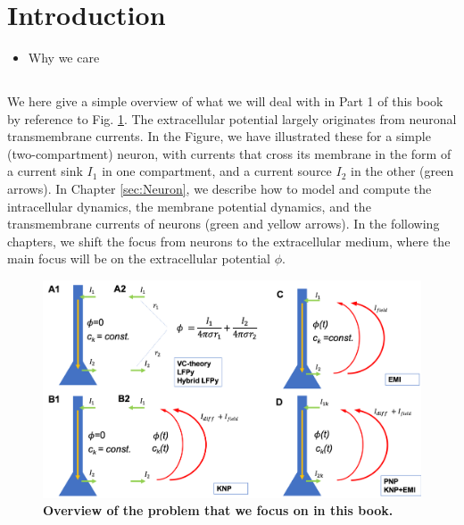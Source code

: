 \section{Introduction} 
\label{sec:Intro}

\begin{itemize}
\item Why we care \citep{Buzsaki2012,Pettersen2012,Einevoll2013,Einevoll2013a,Einevoll2019}
\end{itemize}


\subsection{}


We here give a simple overview of what we will deal with in Part 1 of this book by reference to Fig. \ref{Intro:fig:Knallfigur}. The extracellular potential largely originates from neuronal transmembrane currents. In the Figure, we have illustrated these for a simple (two-compartment) neuron, with currents that cross its membrane in the form of a current sink $I_1$ in one compartment, and a current source $I_2$ in the other (green arrows). In Chapter \ref{sec:Neuron}, we describe how to model and compute the intracellular dynamics, the membrane potential dynamics, and the transmembrane currents of neurons (green and yellow arrows). In the following chapters, we shift the focus from neurons to the extracellular medium, where the main focus will be on the extracellular potential $\phi$.

\begin{figure}[!ht]
\begin{center}
\includegraphics[width=1\textwidth]{Figures/Skjemaoversikt.png}
\end{center}
\caption{\textbf{Overview of the problem that we focus on in this book.} 
}
\label{Intro:fig:Knallfigur}
\end{figure}

